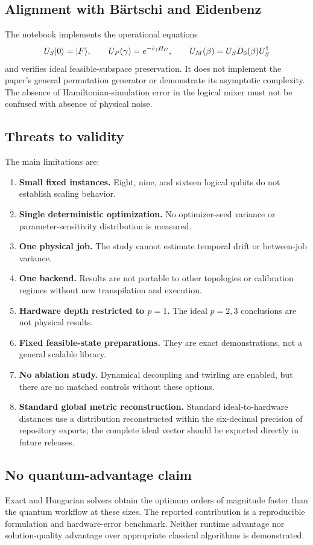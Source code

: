 \subsection{Alignment with Bärtschi and Eidenbenz}

The notebook implements the operational equations
\begin{equation}
U_S\lvert 0\rangle=\lvert F\rangle,\qquad
U_P(\gamma)=e^{-i\gamma H_C},\qquad
U_M(\beta)=U_SD_0(\beta)U_S^\dagger
\end{equation}
and verifies ideal feasible-subspace preservation. It does not implement the paper's general permutation generator or demonstrate its asymptotic complexity. The absence of Hamiltonian-simulation error in the logical mixer must not be confused with absence of physical noise.

\subsection{Threats to validity}

The main limitations are:
\begin{enumerate}
  \item \textbf{Small fixed instances.} Eight, nine, and sixteen logical qubits do not establish scaling behavior.
  \item \textbf{Single deterministic optimization.} No optimizer-seed variance or parameter-sensitivity distribution is measured.
  \item \textbf{One physical job.} The study cannot estimate temporal drift or between-job variance.
  \item \textbf{One backend.} Results are not portable to other topologies or calibration regimes without new transpilation and execution.
  \item \textbf{Hardware depth restricted to $p=1$.} The ideal $p=2,3$ conclusions are not physical results.
  \item \textbf{Fixed feasible-state preparations.} They are exact demonstrations, not a general scalable library.
  \item \textbf{No ablation study.} Dynamical decoupling and twirling are enabled, but there are no matched controls without these options.
  \item \textbf{Standard global metric reconstruction.} Standard ideal-to-hardware distances use a distribution reconstructed within the six-decimal precision of repository exports; the complete ideal vector should be exported directly in future releases.
\end{enumerate}

\subsection{No quantum-advantage claim}

Exact and Hungarian solvers obtain the optimum orders of magnitude faster than the quantum workflow at these sizes. The reported contribution is a reproducible formulation and hardware-error benchmark. Neither runtime advantage nor solution-quality advantage over appropriate classical algorithms is demonstrated.
